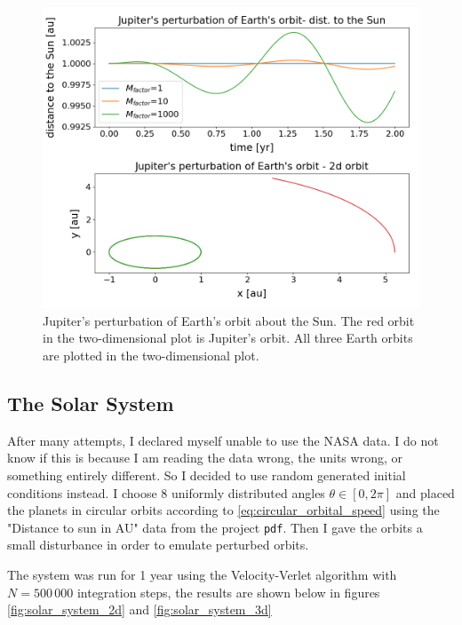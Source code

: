 \documentclass[reprint,english]{revtex4-1}
\begin{document}
\begin{figure}[]
\centering
\includegraphics[scale=0.3]{../output/three_body_problem/Earth_perturbed_orbit.png}
\caption{Jupiter's perturbation of Earth's orbit about the Sun. The red orbit in the two-dimensional plot is Jupiter's orbit. All three Earth orbits are plotted in the two-dimensional plot.}\label{fig:Earth_Jupiter_perturbation}
\end{figure}
\subsection{The Solar System}
After many attempts, I declared myself unable to use the NASA data. I do not know if this is because I am reading the data wrong, the units wrong, or something entirely different. So I decided to use random generated initial conditions instead. I choose 8 uniformly distributed angles \(\theta\in[0,2\pi]\) and placed the planets in circular orbits according to \eqref{eq:circular_orbital_speed} using the "Distance to sun in AU" data from the project \texttt{pdf}. Then I gave the orbits a small disturbance in order to emulate perturbed orbits.

The system was run for 1 year using the Velocity-Verlet algorithm with \(N=500\,000\) integration steps, the results are shown below in figures \ref{fig:solar_system_2d} and \ref{fig:solar_system_3d}
\end{document}
